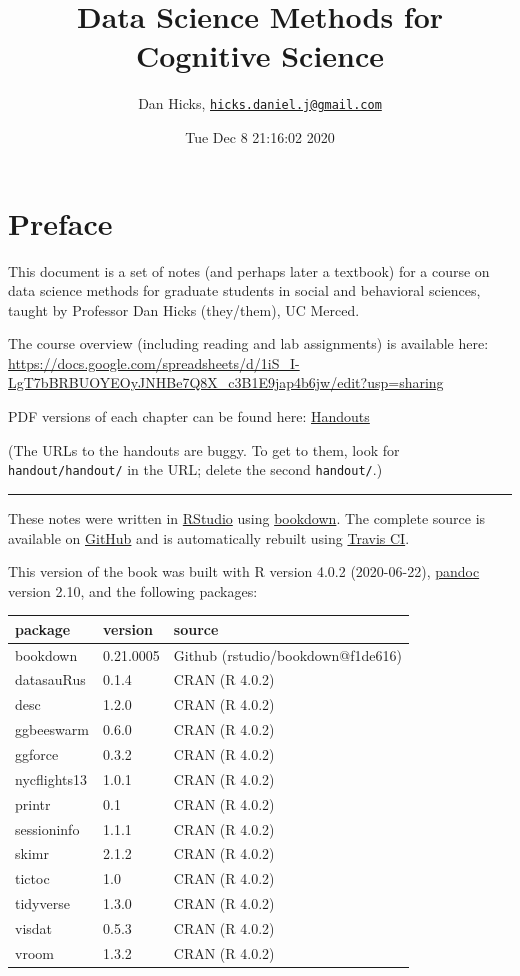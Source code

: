 \documentclass[
]{article}
\title{Data Science Methods for Cognitive Science}
\author{Dan Hicks, \href{mailto:hicks.daniel.j@gmail.com}{\nolinkurl{hicks.daniel.j@gmail.com}}}
\date{Tue Dec 8 21:16:02 2020}
\begin{document}
\maketitle

{
\setcounter{tocdepth}{2}
\tableofcontents
}
\hypertarget{preface}{%
\section*{Preface}\label{preface}}

This document is a set of notes (and perhaps later a textbook) for a course on data science methods for graduate students in social and behavioral sciences, taught by Professor Dan Hicks (they/them), UC Merced.

The course overview (including reading and lab assignments) is available here: \url{https://docs.google.com/spreadsheets/d/1iS_I-LgT7bBRBUOYEOyJNHBe7Q8X_c3B1E9jap4b6jw/edit?usp=sharing}

PDF versions of each chapter can be found here: \href{handouts/index.html}{Handouts}

(The URLs to the handouts are buggy. To get to them, look for \texttt{handout/handout/} in the URL; delete the second \texttt{handout/}.)

\begin{center}\rule{0.5\linewidth}{0.5pt}\end{center}

These notes were written in \href{http://www.rstudio.com/ide/}{RStudio} using \href{http://bookdown.org/}{bookdown}. The complete source is available on \href{https://github.com/data-science-methods/book/}{GitHub} and is automatically rebuilt using \href{https://github.com/data-science-methods/book/}{Travis CI}.

This version of the book was built with R version 4.0.2 (2020-06-22), \href{https://pandoc.org/}{pandoc} version 2.10, and the following packages:

\begin{longtable}[]{@{}lll@{}}
\toprule
package & version & source\tabularnewline
\midrule
\endhead
bookdown & 0.21.0005 & Github (rstudio/bookdown@f1de616)\tabularnewline
datasauRus & 0.1.4 & CRAN (R 4.0.2)\tabularnewline
desc & 1.2.0 & CRAN (R 4.0.2)\tabularnewline
ggbeeswarm & 0.6.0 & CRAN (R 4.0.2)\tabularnewline
ggforce & 0.3.2 & CRAN (R 4.0.2)\tabularnewline
nycflights13 & 1.0.1 & CRAN (R 4.0.2)\tabularnewline
printr & 0.1 & CRAN (R 4.0.2)\tabularnewline
sessioninfo & 1.1.1 & CRAN (R 4.0.2)\tabularnewline
skimr & 2.1.2 & CRAN (R 4.0.2)\tabularnewline
tictoc & 1.0 & CRAN (R 4.0.2)\tabularnewline
tidyverse & 1.3.0 & CRAN (R 4.0.2)\tabularnewline
visdat & 0.5.3 & CRAN (R 4.0.2)\tabularnewline
vroom & 1.3.2 & CRAN (R 4.0.2)\tabularnewline
\bottomrule
\end{longtable}
\end{document}
